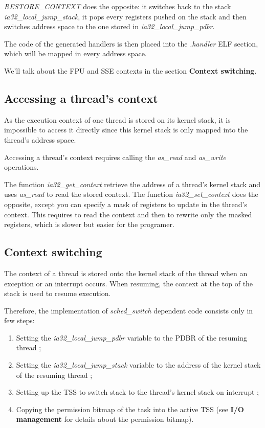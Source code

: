\textit{RESTORE\_CONTEXT} does the opposite: it switches back to the
stack \textit{ia32\_local\_jump\_stack}, it pops every registers
pushed on the stack and then switches address space to the one stored
in \textit{ia32\_local\_jump\_pdbr}.

The code of the generated handlers is then placed into the
\textit{.handler} ELF section, which will be mapped in every address
space.

We'll talk about the FPU and SSE contexts in the section
\textbf{Context switching}.

%
%

\subsection{Accessing a thread's context}

As the execution context of one thread is stored on its kernel stack,
it is impossible to access it directly since this kernel stack is only
mapped into the thread's address space.

Accessing a thread's context requires calling the \textit{as\_read}
and \textit{as\_write} operations.

The function \textit{ia32\_get\_context} retrieve the address of a
thread's kernel stack and uses \textit{as\_read} to read the stored
context. The function \textit{ia32\_set\_context} does the opposite,
except you can specify a mask of registers to update in the thread's
context. This requires to read the context and then to rewrite only
the masked registers, which is slower but easier for the programer.

%
%

\subsection{Context switching}

The context of a thread is stored onto the kernel stack of the thread
when an exception or an interrupt occurs. When resuming, the context
at the top of the stack is used to resume execution.

Therefore, the implementation of \textit{sched\_switch} dependent code
consists only in few steps:

\begin{enumerate}
\item Setting the \textit{ia32\_local\_jump\_pdbr} variable to the
PDBR of the resuming thread ;
\item Setting the \textit{ia32\_local\_jump\_stack} variable to the
address of the kernel stack of the resuming thread ;
\item Setting up the TSS to switch stack to the thread's kernel stack
on interrupt ;
\item Copying the permission bitmap of the task into the active TSS
(see \textbf{I/O management} for details about the permission bitmap).
\end{enumerate}


